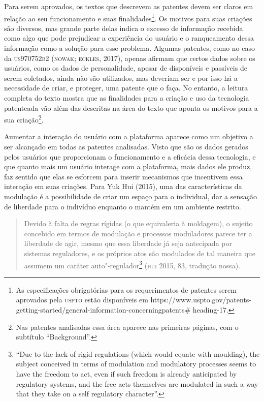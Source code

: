 Para serem aprovados, os textos que descrevem as patentes devem ser
claros em relação ao seu funcionamento e suas finalidades\footnote{As
  especificações obrigatórias para os requerimentos de patentes serem
  aprovados pela \textsc{uspto}
  estão disponíveis em
  https://www.uspto.gov/patents-getting-started/general-information-concerningpatents\#
  heading-17.}. Os motivos para suas criações são diversos, mas grande
parte delas indica o excesso de informação recebida como algo que pode
prejudicar a experiência do usuário e o ranqueamento dessa informação
como a solução para esse problema. Algumas patentes, como no caso da
\textsc{us970752b2} (\textsc{nowak}; \textsc{eckles}, 2017), apenas afirmam que certos dados sobre
os usuários, como os dados de personalidade, apesar de disponíveis e
passíveis de serem coletados, ainda não são utilizados, mas deveriam ser
e por isso há a necessidade de criar, e proteger, uma patente que o
faça. No entanto, a leitura completa do texto mostra que as finalidades
para a criação e uso da tecnologia patenteada vão além das descritas na
área do texto que aponta os motivos para a sua criação\footnote{Nas
  patentes analisadas essa área aparece nas primeiras páginas, com o
  subtítulo ``Background''.}.

Aumentar a interação do usuário com a plataforma aparece como um
objetivo a ser alcançado em todas as patentes analisadas. Visto que são
os dados gerados pelos usuários que proporcionam o funcionamento e a
eficácia dessa tecnologia, e que quanto mais um usuário interage com a
plataforma, mais dados ele produz, faz sentido que elas se esforcem para
inserir mecanismos que incentivem essa interação em suas criações. Para
Yuk Hui (2015), uma das características da modulação é a possibilidade
de criar um espaço para o individual, dar a sensação de liberdade para o
indivíduo enquanto o mantém em um ambiente restrito.

\begin{quote}
Devido à falta de regras rígidas (o que equivaleria à moldagem), o
sujeito concebido em termos de modulação e processos moduladores parece
ter a liberdade de agir, mesmo que essa liberdade já seja antecipada por
sistemas reguladores, e os próprios atos são modulados de tal maneira
que assumem um caráter auto"-regulador\footnote{``Due to the lack of
  rigid regulations (which would equate with moulding), the subject
  conceived in terms of modulation and modulatory processes seems to
  have the freedom to act, even if such freedom is already anticipated
  by regulatory systems, and the free acts themselves are modulated in
  such a way that they take on a self regulatory character''.} (\textsc{hui}
2015, 83, tradução nossa).
\end{quote}

